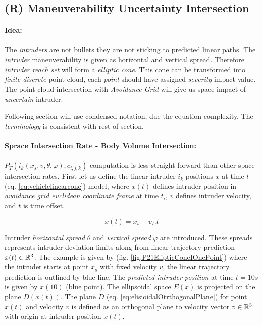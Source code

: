 \subsection{(R) Maneuverability Uncertainty Intersection}\label{s:uncertaintyIntersection}
\paragraph{Idea:} The \emph{intruders} are not bullets they are not sticking to predicted linear paths. The \emph{intruder} maneuverability is given as horizontal and vertical spread. Therefore \emph{intruder reach set} will form a \emph{elliptic cone}. This cone can be transformed into \emph{finite discrete } point-cloud, each \emph{point} should have assigned \emph{severity} impact value.  The point cloud intersection with  \emph{Avoidance Grid} will give us space impact of \emph{uncertain} intruder.


\begin{note}
    Following section will use condensed notation, due the equation complexity. The \emph{terminology} is consistent with rest of section. 
\end{note}

\paragraph{Sprace Intersection Rate - Body Volume Intersection:} $P_T(i_k({x}_s,{v},\theta,\varphi),c_{i,j,k})$
computation is less straight-forward than other space intersection rates. First let us define the linear intruder $i_k$ positions ${x}$ at time $t$ (eq. \ref{eq:vehiclelinearcone}) model, where ${x}(t)$ defines intruder position in \emph{avoidance grid euclidean coordinate frame} at time $t_i$, ${v}$ defines intruder velocity, and $t$ is time offset.

\begin{equation}\label{eq:vehiclelinearcone}
    x(t)=x_s + v_I.t
\end{equation}

\noindent Intruder \emph{horizontal spread} $\theta$ and \emph{vertical spread} $\varphi$ are introduced. These spreads represents intruder deviation limits along from linear trajectory prediction ${x}(t)\in\mathbb{R}^3$. The example is given by (fig. \ref{fig:P21ElipticConeIOnePoint}) where the intruder starts at point ${x}_s$ with fixed velocity $v$, the linear trajectory prediction is outlined by blue line. The \emph{predicted intruder position} at time $t=10s$ is given by ${x}(10)$ (blue point). The ellipsoidal space $E({x})$ is projected on the plane $D({x}(t))$. The plane $D$ (eq. \ref{eq:elisioidalOtrthogonalPlane}) for point ${x}(t)$ and velocity ${v}$ is defined as an orthogonal plane to velocity vector ${v}\in\mathbb{R}^3$ with origin at intruder position ${x}(t)$. 

